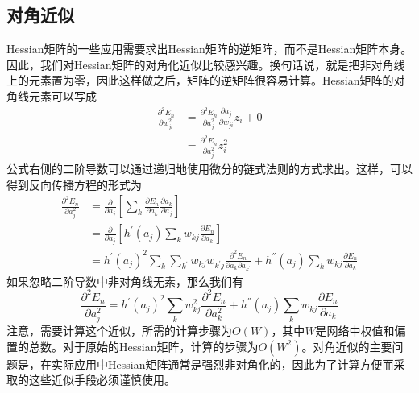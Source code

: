 \subsection*{对角近似}
Hessian矩阵的一些应用需要求出Hessian矩阵的逆矩阵，而不是Hessian矩阵本身。因此，我们对Hessian矩阵的对角化近似比较感兴趣。换句话说，就是把非对角线上的元素置为零，因此这样做之后，矩阵的逆矩阵很容易计算。Hessian矩阵的对角线元素可以写成
\begin{equation}
\begin{aligned}
	\frac{\partial^2 E_n}{\partial w_{ji}^2}&=\frac{\partial^2 E_n}{\partial a_j^2}\frac{\partial a_j}{\partial w_{ji}}z_i+0\\
	&=\frac{\partial^2 E_n}{\partial a_j^2}z_i^2
\end{aligned}
\end{equation}
公式右侧的二阶导数可以通过递归地使用微分的链式法则的方式求出。这样，可以得到反向传播方程的形式为
\begin{equation}
\begin{aligned}
	\frac{\partial^2 E_n}{\partial a_j^2}&=\frac{\partial}{\partial a_j}\left[\sum_{k}\frac{\partial E_n}{\partial a_k}\frac{\partial a_k}{\partial a_j} \right]\\
	&=\frac{\partial}{\partial a_j}\left[h^{'}(a_j)\sum_{k}w_{kj}\frac{\partial E_n}{\partial a_k} \right]\\
	&=h^{'}(a_j)^2\sum_{k}\sum_{k^{'}}w_{kj}w_{k^{'}j}\frac{\partial^2 E_n}{\partial a_k\partial a_{k^{'}}}+h^{''}(a_j)\sum_{k}w_{kj}\frac{\partial E_n}{\partial a_k}
\end{aligned}
\end{equation}
如果忽略二阶导数中非对角线无素，那么我们有
\begin{equation}
	\frac{\partial^2 E_n}{\partial a_j^2}=h^{'}(a_j)^2\sum_{k}w_{kj}^2\frac{\partial^2 E_n}{\partial a_k^2}+h^{''}(a_j)\sum_{k}w_{kj}\frac{\partial E_n}{\partial a_k}
\end{equation}
注意，需要计算这个近似，所需的计算步骤为$O(W)$，其中$W$是网络中权值和偏置的总数。对于原始的Hessian矩阵，计算的步骤为$O(W^2)$。对角近似的主要问题是，在实际应用中Hessian矩阵通常是强烈非对角化的，因此为了计算方便而采取的这些近似手段必须谨慎使用。
